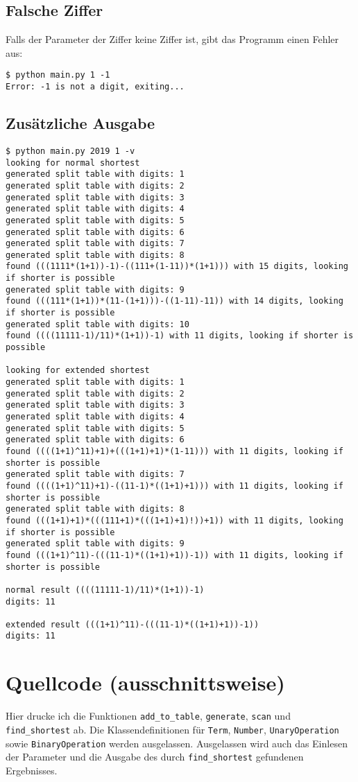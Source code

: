 \documentclass[a4paper,10pt,ngerman]{scrartcl}
\begin{document}
\subsection{Falsche Ziffer}
Falls der Parameter der Ziffer keine Ziffer ist, gibt das Programm einen Fehler aus:
\begin{lstlisting}
$ python main.py 1 -1
Error: -1 is not a digit, exiting...
\end{lstlisting}


\subsection{Zusätzliche Ausgabe}
\begin{lstlisting}
$ python main.py 2019 1 -v
looking for normal shortest
generated split table with digits: 1
generated split table with digits: 2
generated split table with digits: 3
generated split table with digits: 4
generated split table with digits: 5
generated split table with digits: 6
generated split table with digits: 7
generated split table with digits: 8
found (((1111*(1+1))-1)-((111+(1-11))*(1+1))) with 15 digits, looking if shorter is possible
generated split table with digits: 9
found (((111*(1+1))*(11-(1+1)))-((1-11)-11)) with 14 digits, looking if shorter is possible
generated split table with digits: 10
found ((((11111-1)/11)*(1+1))-1) with 11 digits, looking if shorter is possible

looking for extended shortest
generated split table with digits: 1
generated split table with digits: 2
generated split table with digits: 3
generated split table with digits: 4
generated split table with digits: 5
generated split table with digits: 6
found ((((1+1)^11)+1)+(((1+1)+1)*(1-11))) with 11 digits, looking if shorter is possible
generated split table with digits: 7
found ((((1+1)^11)+1)-((11-1)*((1+1)+1))) with 11 digits, looking if shorter is possible
generated split table with digits: 8
found (((1+1)+1)*(((111+1)*(((1+1)+1)!))+1)) with 11 digits, looking if shorter is possible
generated split table with digits: 9
found (((1+1)^11)-(((11-1)*((1+1)+1))-1)) with 11 digits, looking if shorter is possible

normal result ((((11111-1)/11)*(1+1))-1)
digits: 11

extended result (((1+1)^11)-(((11-1)*((1+1)+1))-1))
digits: 11
\end{lstlisting}

\section{Quellcode (ausschnittsweise)}
Hier drucke ich die Funktionen \texttt{add\_to\_table}, \texttt{generate}, \texttt{scan} und \texttt{find\_shortest} ab.
Die Klassendefinitionen für \texttt{Term}, \texttt{Number}, \texttt{UnaryOperation} sowie \texttt{BinaryOperation} werden ausgelassen.
Ausgelassen wird auch das Einlesen der Parameter und die Ausgabe des durch \texttt{find\_shortest} gefundenen Ergebnisses.


\end{document}
